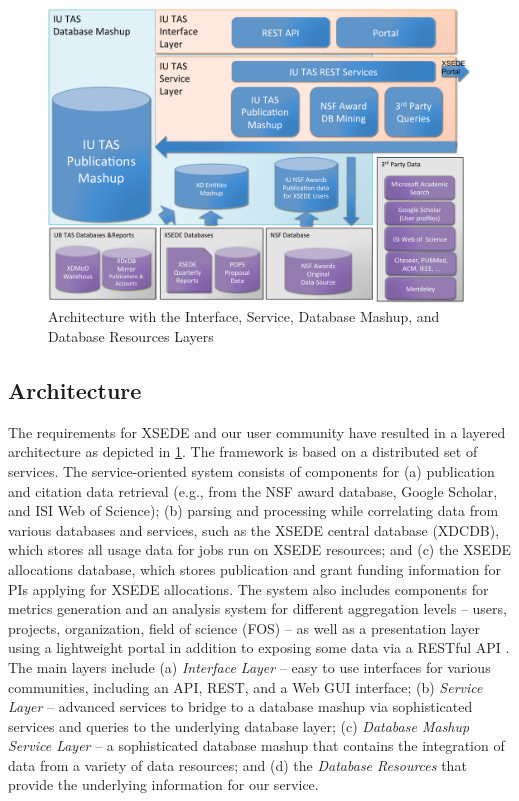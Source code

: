 \documentclass[10pt, conference, compsocconf]{IEEEtran}
\begin{document}
\begin{figure}[htb] 
  \centering 
    \includegraphics[width=1.0\columnwidth]{images-new/architecture.pdf} 
  \caption{Architecture with the Interface, Service, Database Mashup,
    and Database Resources Layers}\label{F:architecture} 
\end{figure} 



\subsection{Architecture}

The requirements for XSEDE and our user community have resulted in a layered architecture as depicted in \ref{F:architecture}.  The framework is based on a distributed set of services.  The service-oriented system consists of components for (a) publication and citation data retrieval (e.g., from the NSF award database, Google Scholar, and ISI Web of Science); (b) parsing and processing while correlating data from various databases and services, such as the XSEDE central database (XDCDB), which stores all usage data for jobs run on XSEDE resources; and (c) the XSEDE allocations database, which stores publication and grant funding information for PIs applying for XSEDE allocations.  The system also includes components for metrics generation and an analysis system for different aggregation levels -- users, projects, organization, field of science (FOS) -- as well as a presentation layer using a lightweight portal in addition to exposing some data via a RESTful API \cite{las14impact}.  The main layers include (a) {\em Interface Layer} -- easy to use interfaces for various communities, including an API, REST, and a Web GUI interface; (b) {\em Service Layer} -- advanced services to bridge to a database mashup via sophisticated services and queries to the underlying database layer; (c) {\em Database Mashup Service Layer} -- a sophisticated database mashup that contains the integration of data from a variety of data resources; and (d) the {\em Database Resources} that provide the underlying information for our service.
\end{document}
